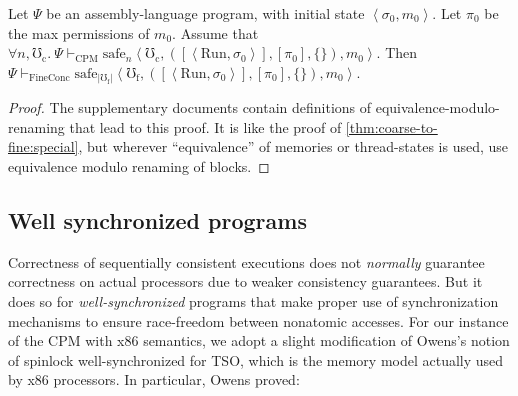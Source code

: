 \begin{theorem}
\label{thm:coarse-to-fine}
Let $\Psi$ be an assembly-language program,
with initial state $\left<\sigma_0,m_0\right>$.
Let $\pi_0$ be the max permissions of $m_0$.
\newline
Assume that  $\forall n,\mho_\mathrm{c}.~
\Psi \vdash_\mathrm{CPM}
\mathrm{safe}_n\left<\mho_\mathrm{c},
([\left<\mathrm{Run},\sigma_0\right>],[\pi_0], \{\}), m_0\right>$.
\newline
Then $ %
\Psi \vdash_\mathrm{FineConc}
\mathrm{safe}_{|\mho_\mathrm{f}|}\left<\mho_\mathrm{f},
([\left<\mathrm{Run},\sigma_0\right>],[\pi_0], \{\}), m_0\right>$.
\end{theorem}
\begin{proof}
The supplementary documents contain definitions of equivalence-modulo-renaming that lead to this proof.
  It is like the proof of \autoref {thm:coarse-to-fine:special},
  but wherever ``equivalence'' of memories or thread-states is used,
  use equivalence modulo renaming of blocks.  
\end{proof}





\subsection{Well synchronized programs}
\label{sec:weak}

Correctness of sequentially consistent executions does not
\emph{normally} guarantee correctness on actual processors due to
weaker consistency guarantees.  But it does so for
\emph{well-synchronized} programs that make proper use of
synchronization mechanisms to ensure race-freedom between nonatomic
accesses. For our instance of the CPM with x86 semantics, we adopt a
slight modification of Owens's \cite{owens10:ecoop} notion of spinlock
well-synchronized for TSO, which is the memory model actually used by x86 processors. In particular, Owens proved:

